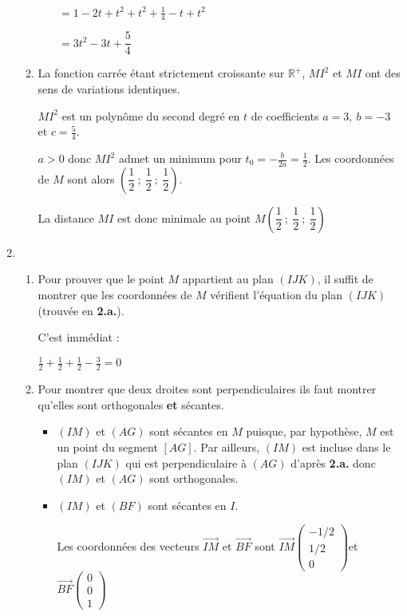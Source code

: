 \begin{corrige}
\begin{enumerate}
\begin{enumerate}
               $\phantom{MI^2}=1-2t+t^2+t^2+\frac{1}{4}-t +t^2$
               \par
               $\phantom{MI^2}= 3t^2-3t+\dfrac{5}{4}$
               \item
               La fonction carrée étant strictement croissante sur $\mathbb{R}^+$, $MI^2$ et $MI$ ont des sens de variations identiques.
               \par
               $MI^2$ est un polynôme du second degré en $t$ de coefficients $a=3,\ b=-3$ et $c=\frac{5}{4}$.
               \par
               $a>0$ donc $MI^2$ admet un minimum pour $t_0=-\frac{b}{2a}=\frac{1}{2}$. Les coordonnées de $M$ sont alors $\left(\dfrac{1}{2}~;~\dfrac{1}{2}~;~\dfrac{1}{2}\right)$.
               \par
               La distance $MI$ est donc minimale au point $M\left(\dfrac{1}{2}~;~\dfrac{1}{2}~;~\dfrac{1}{2}\right)$
          \end{enumerate}
          \item
          \begin{enumerate}
               \item
               Pour prouver que le point $M$ appartient au plan $(IJK)$, il suffit de montrer que les coordonnées de $M$ vérifient l'équation du plan $(IJK)$ (trouvée en \textbf{2.a.}).
               \par
               C'est immédiat :
               \par
               $\frac{1}{2}+\frac{1}{2}+\frac{1}{2}-\frac{3}{2}=0$
               \item
               Pour montrer que deux droites sont perpendiculaires ils faut montrer qu'elles sont orthogonales \textbf{et} sécantes.
               \begin{itemize}
                    \item
                    $(IM)$ et $(AG)$ sont sécantes en $M$ puisque, par hypothèse, $M$ est un point du segment $[AG]$. Par ailleurs, $(IM)$ est incluse dans le plan $(IJK)$ qui est perpendiculaire à $(AG)$ d'après \textbf{2.a.} donc $(IM)$ et $(AG)$ sont orthogonales.
                    \item
                    $(IM)$ et $(BF)$ sont sécantes en $I$.
                    \par
                    Les coordonnées des vecteurs $\overrightarrow{IM}$ et $\overrightarrow{BF}$ sont $\overrightarrow{IM}\begin{pmatrix} -1/2 \\ 1/2 \\ 0  \end{pmatrix}$et $\overrightarrow{BF}\begin{pmatrix}  0 \\ 0 \\ 1   \end{pmatrix}$

\end{itemize}
\end{enumerate}
\end{enumerate}
\end{corrige}
